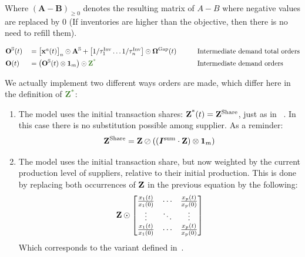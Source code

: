 Where $(\bm{A} - \bm{B})_{\geq 0}$ denotes the resulting matrix of $A -
B$ where negative values are replaced by 0 (If inventories are higher than the
objective, then there is no need to refill them).

\begin{alignat*}{4}
  & \ioorders^{\sectorsset}(t) &  & = \begin{bmatrix}
    \iox^a(t) \end{bmatrix}_{n} \odot  \ioa^{\sectorsset} + \begin{bmatrix} 1 / \tau^{\textrm{Inv}}_1 \hdots 1 / \tau^{\textrm{Inv}}_n  \end{bmatrix} \odot \ioinv^{\textrm{Gap}}(t) &  & \quad &  & \text{Intermediate demand total orders}\\
 & \ioorders(t)               &  & = \left ( \ioorders^{\sectorsset}(t) \otimes \bm{1}_{m} \right ) \odot  {\textcolor{OliveGreen}{\ioz^{\textrm{*}}}} &  & \quad &  & \text{Intermediate demand orders}
\end{alignat*}

We actually implement two different ways orders are made, which differ here in
the definition of ${\textcolor{OliveGreen}{\ioz^{\textrm{*}}}}$:

\begin{enumerate}
\item The model uses the initial transaction shares: $\mathbf{Z}^{\textrm{*}}(t) =
  \mathbf{Z}^{\textrm{Share}}$, just as in
 ~\textcite{hallegatte-2013-model-role}. In this case there is no
  substitution possible among supplier. As a reminder:
  \[
  \begin{split}
    \mathbf{Z}^{\textrm{Share}} =  \mathbf{Z} \oslash \left ( \left (
    \bm{I^{\textrm{sum}}} \cdot  \mathbf{Z} \right ) \otimes
    \bm{1}_{m}
    \right )
  \end{split}
\]
\item The model uses the initial transaction share, but now weighted by the
  current production level of suppliers, relative to their initial production. This
  is done by replacing both occurrences of $\mathbf{Z}$ in the previous equation by
  the following:
  \[
    \begin{split}
      \mathbf{Z} \odot
      \begin{bmatrix}
        \frac{x_{1}(t)}{x_{1}(0)} & \cdots & \frac{x_{p}(t)}{x_{p}(0)}\\
        \vdots & \ddots & \vdots \\
        \frac{x_{1}(t)}{x_{1}(0)} & \cdots & \frac{x_{p}(t)}{x_{p}(0)}
      \end{bmatrix}
    \end{split}
  \]
  Which corresponds to the variant defined in~\textcite{guan-2020-global-suppl}.
\end{enumerate}

